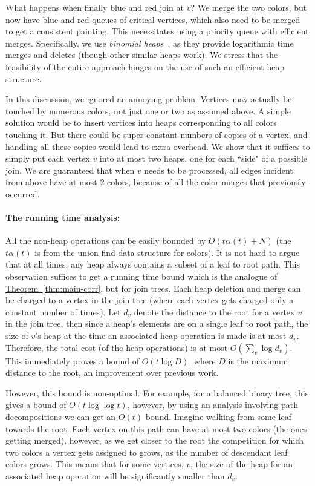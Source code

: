 \documentclass[11pt]{article}
\newcommand{\myparagraph}[1]{\paragraph{#1}}
\theoremstyle{definition}
\newcommand{\Thm}[1]{\hyperref[thm:#1]{Theorem~\ref*{thm:#1}}} %
\begin{document}
{What happens when finally blue and red join at $v$? We merge the two colors, but now have
blue and red queues of critical vertices, which also need to be merged to get a consistent painting. 
This necessitates using a priority queue with efficient merges.
Specifically, we use \emph{binomial heaps}~\cite{Vu78}, as they provide logarithmic time merges and deletes (though other similar heaps work). 
We stress that the feasibility of the entire approach hinges on the use of such an efficient heap structure.

In this discussion, we ignored an annoying problem. Vertices
may actually be touched by numerous colors, not just one or two as assumed above. A simple solution
would be to insert vertices into heaps corresponding to all colors touching it. But there could
be super-constant numbers of copies of a vertex, and handling all these copies would lead
to extra overhead. We show that it suffices to simply put each vertex $v$ into at most two heaps, one for each
``side" of a possible join. We are guaranteed that when $v$ needs to be processed, all edges incident from above have
at most $2$ colors, because of all the color merges that previously occurred.

\myparagraph{The running time analysis:} 
 All the non-heap operations can be easily bounded by $O(t\alpha(t) + N)$ (the $t\alpha(t)$ is from the union-find data structure
 for colors). It is not hard to argue that at all times, any heap always contains a subset of a leaf to root path.
 This observation suffices to get a running time bound which is the analogue of \Thm{main-corr}, but for join trees. 
 Each heap deletion and merge can be charged to a vertex in the join tree (where each vertex gets charged only a constant number of times).
 Let $d_v$ denote the distance to the root for a vertex $v$ in the join tree, then since a heap's elements are on a single leaf to root 
 path, the size of $v$'s heap at the time an associated heap operation is made is at most $d_v$.
 Therefore, the total cost (of the heap operations) is at most $O(\sum_v \log d_v)$. This immediately proves a bound of $O(t\log D)$, where
 $D$ is the maximum distance to the root, an improvement over previous work. 
 
 However, this bound is non-optimal.  For example, for a balanced binary tree, this gives a bound of $O(t\log\log t)$, however, by using 
 an analysis involving path decompositions we can get an $O(t)$ bound.  Imagine walking from some leaf 
 towards the root. Each vertex on this path can have at most two colors (the ones getting merged), however, as we get closer to the root 
 the competition for which two colors a vertex gets assigned to grows, as the number of descendant leaf colors grows. This means that for some vertices, 
 $v$, the size of the heap for an associated heap operation will be significantly smaller than $d_v$. 
 
}
\end{document}
